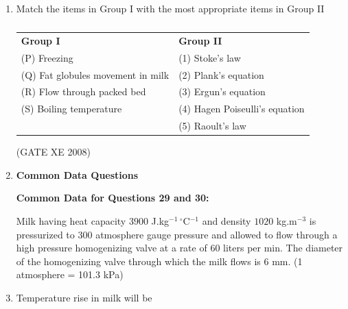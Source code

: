 \documentclass[12pt]{article}
\begin{document}
\begin{enumerate}
(GATE XE 2008)  

\item  Match the items in Group I with the most appropriate items in Group II  

\begin{table}[H]     \centering     \caption{}     \label{}     \begin{tabular}{p{7cm} p{7cm}}
\textbf{Group I} & \textbf{Group II} \\
(P) Freezing & (1) Stoke's law \\
(Q) Fat globules movement in milk & (2) Plank's equation \\
(R) Flow through packed bed & (3) Ergun's equation \\
(S) Boiling temperature & (4) Hagen Poiseulli's equation \\
& (5) Raoult's law \\
\end{tabular} \end{table}  

\begin{enumerate}
\end{enumerate}
(GATE XE 2008)  

\item[] \textbf{\Large Common Data Questions}

\textbf{Common Data for Questions 29 and 30:} 

Milk having heat capacity $3900$ J.kg$^{-1} \, ^\circ$C$^{-1}$ and density $1020$ kg.m$^{-3}$ is pressurized to 300 atmosphere gauge pressure and allowed to flow through a high pressure homogenizing valve at a rate of 60 liters per min. The diameter of the homogenizing valve through which the milk flows is 6 mm. (1 atmosphere = 101.3 kPa)  

\item Temperature rise in milk will be  

\begin{enumerate}
\end{enumerate}


\end{enumerate}
\end{document}
